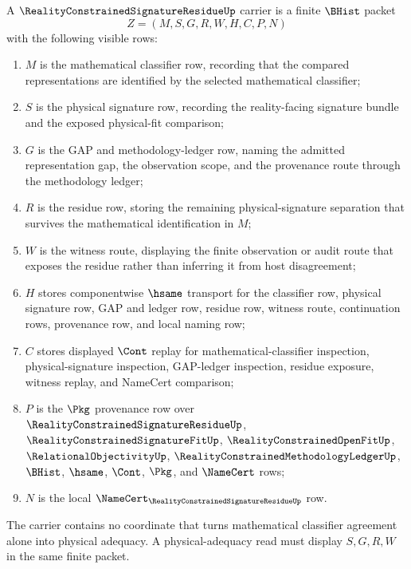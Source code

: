 \begin{definition}
\label{def:reality-constrained-signature-residue-carrier}
A $\RealityConstrainedSignatureResidueUp$ carrier is a finite $\BHist$ packet
$$
Z=(M,S,G,R,W,H,C,P,N)
$$
with the following visible rows:
\begin{enumerate}
\item $M$ is the mathematical classifier row, recording that the compared representations are identified by the selected mathematical classifier;
\item $S$ is the physical signature row, recording the reality-facing signature bundle and the exposed physical-fit comparison;
\item $G$ is the GAP and methodology-ledger row, naming the admitted representation gap, the observation scope, and the provenance route through the methodology ledger;
\item $R$ is the residue row, storing the remaining physical-signature separation that survives the mathematical identification in $M$;
\item $W$ is the witness route, displaying the finite observation or audit route that exposes the residue rather than inferring it from host disagreement;
\item $H$ stores componentwise $\hsame$ transport for the classifier row, physical signature row, GAP and ledger row, residue row, witness route, continuation rows, provenance row, and local naming row;
\item $C$ stores displayed $\Cont$ replay for mathematical-classifier inspection, physical-signature inspection, GAP-ledger inspection, residue exposure, witness replay, and NameCert comparison;
\item $P$ is the $\Pkg$ provenance row over $\RealityConstrainedSignatureResidueUp$, $\RealityConstrainedSignatureFitUp$, $\RealityConstrainedOpenFitUp$, $\RelationalObjectivityUp$, $\RealityConstrainedMethodologyLedgerUp$, $\BHist$, $\hsame$, $\Cont$, $\Pkg$, and $\NameCert$ rows;
\item $N$ is the local $\NameCert_{\RealityConstrainedSignatureResidueUp}$ row.
\end{enumerate}
The carrier contains no coordinate that turns mathematical classifier agreement alone into physical adequacy. A physical-adequacy read must display $S,G,R,W$ in the same finite packet.
\end{definition}

